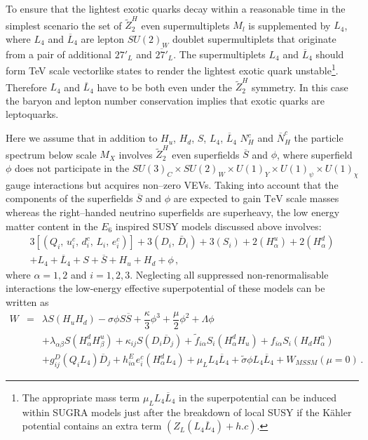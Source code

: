 \documentclass[12pt,a4paper]{article}
\newcommand{\be}{\begin{equation}}
\newcommand{\ee}{\end{equation}}
\newcommand{\ba}{\begin{array}}
\newcommand{\ea}{\end{array}}
\begin{document}
To ensure that the lightest exotic quarks decay within a reasonable time in the simplest scenario
the set of $\tilde{Z}^{H}_2$ even supermultiplets $M_{l}$ is supplemented by $L_4$, where $L_4$ and
$\overline{L}_4$ are lepton $SU(2)_W$ doublet supermultiplets that originate from a pair of additional
$27'_{L}$ and $\overline{27'}_L$. The supermultiplets $L_4$ and $\overline{L}_4$ should form TeV scale
vectorlike states to render the lightest exotic quark unstable\footnote{The appropriate mass term
$\mu_L L_4\overline{L}_4$ in the superpotential can be induced within SUGRA models just after the
breakdown of local SUSY if the K\"ahler potential contains an extra term $(Z_L (L_4\overline{L}_4)+h.c)$\cite{45}.}.
Therefore $L_4$ and $\overline{L}_4$ have to be both even under the $\tilde{Z}^{H}_2$ symmetry.
In this case the baryon and lepton number conservation implies that exotic quarks are leptoquarks.

Here we assume that in addition to $H_u$, $H_d$, $S$, $L_4$,
$\overline{L}_4$ $N^c_H$ and $\overline{N}_H^c$ the particle spectrum
below scale $M_X$ involves $\tilde{Z}^{H}_2$ even superfields
$\overline{S}$ and $\phi$, where superfield $\phi$ does not
participate in the $SU(3)_C\times SU(2)_W\times U(1)_Y\times
U(1)_{\psi}\times U(1)_{\chi}$ gauge interactions but acquires
non--zero VEVs. Taking into account that the components of the
superfields $\overline{S}$ and $\phi$ are expected to gain
$\mbox{TeV}$ scale masses whereas the right--handed neutrino
superfields are superheavy, the low energy matter content in the $E_6$
inspired SUSY models discussed above involves: \be \ba{c}
3\left[(Q_i,\,u^c_i,\,d^c_i,\,L_i,\,e^c_i)\right]
+3(D_i,\,\bar{D}_i)+3(S_{i})+2(H^u_{\alpha})+2(H^d_{\alpha})\\[2mm]
+L_4+\overline{L}_4+S+\overline{S}+H_u+H_d+\phi\,, \ea
\label{hd7}
\ee
where $\alpha=1,2$ and $i=1,2,3$. Neglecting all suppressed non-renormalisable interactions
the low-energy effective superpotential of these models can be written as
\be
\ba{rcl}
W &=& \lambda S (H_u H_d) - \sigma \phi S \overline{S} + \dfrac{\kappa}{3}\phi^3+\dfrac{\mu}{2}\phi^2+\Lambda\phi\\[2mm]
&&+ \lambda_{\alpha\beta} S (H^d_{\alpha} H^u_{\beta})+ \kappa_{ij} S (D_{i} \overline{D}_{j}) + \tilde{f}_{i\alpha} S_{i} (H^d_{\alpha} H_u)
+ f_{i\alpha} S_{i} (H_d H^u_{\alpha}) \\[2mm]
&&+ g^D_{ij} (Q_i L_4) \overline{D}_j+ h^E_{i\alpha} e^c_{i} (H^d_{\alpha} L_4) + \mu_L L_4\overline{L}_4+
\tilde{\sigma} \phi L_4\overline{L}_4+ W_{MSSM}(\mu=0)\,.
\ea
\label{hd8}
\ee
\end{document}
